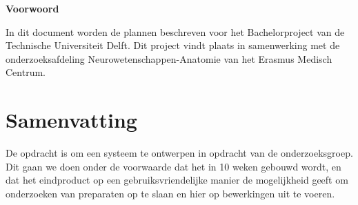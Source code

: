 \begin{center}
\textbf{\large Voorwoord}
\end{center}



In dit document worden de plannen beschreven voor het Bachelor\-project \casam van de Tech\-nische Universiteit Delft.
Dit project vindt plaats in samenwerking met de onderzoeksafdeling Neuro\-wetenschap\-pen-Anatomie van het Erasmus Medisch Centrum.

\section*{Samenvatting}


De opdracht is om een systeem te ontwerpen in opdracht van de \casam onderzoeksgroep.
Dit gaan we doen onder de voorwaarde dat het in 10 weken gebouwd wordt, en dat het eindproduct op een gebruiksvriendelijke manier de mogelijkheid geeft om onderzoeken van preparaten op te slaan en hier op bewerkingen uit te voeren.
